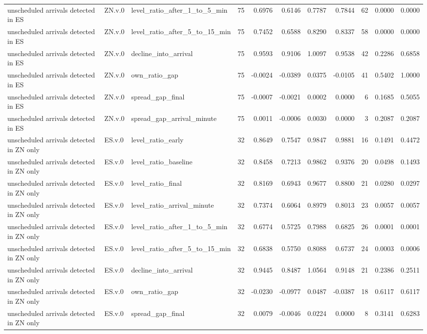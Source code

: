 \begin{tabular}{lllrrrrrrrr}
unscheduled arrivals detected in ES & ZN.v.0 & level_ratio_after_1_to_5_min & 75 & 0.6976 & 0.6146 & 0.7787 & 0.7844 & 62 & 0.0000 & 0.0000 \\
unscheduled arrivals detected in ES & ZN.v.0 & level_ratio_after_5_to_15_min & 75 & 0.7452 & 0.6588 & 0.8290 & 0.8337 & 58 & 0.0000 & 0.0000 \\
unscheduled arrivals detected in ES & ZN.v.0 & decline_into_arrival & 75 & 0.9593 & 0.9106 & 1.0097 & 0.9538 & 42 & 0.2286 & 0.6858 \\
unscheduled arrivals detected in ES & ZN.v.0 & own_ratio_gap & 75 & -0.0024 & -0.0389 & 0.0375 & -0.0105 & 41 & 0.5402 & 1.0000 \\
unscheduled arrivals detected in ES & ZN.v.0 & spread_gap_final & 75 & -0.0007 & -0.0021 & 0.0002 & 0.0000 & 6 & 0.1685 & 0.5055 \\
unscheduled arrivals detected in ES & ZN.v.0 & spread_gap_arrival_minute & 75 & 0.0011 & -0.0006 & 0.0030 & 0.0000 & 3 & 0.2087 & 0.2087 \\
unscheduled arrivals detected in ZN only & ES.v.0 & level_ratio_early & 32 & 0.8649 & 0.7547 & 0.9847 & 0.9881 & 16 & 0.1491 & 0.4472 \\
unscheduled arrivals detected in ZN only & ES.v.0 & level_ratio_baseline & 32 & 0.8458 & 0.7213 & 0.9862 & 0.9376 & 20 & 0.0498 & 0.1493 \\
unscheduled arrivals detected in ZN only & ES.v.0 & level_ratio_final & 32 & 0.8169 & 0.6943 & 0.9677 & 0.8800 & 21 & 0.0280 & 0.0297 \\
unscheduled arrivals detected in ZN only & ES.v.0 & level_ratio_arrival_minute & 32 & 0.7374 & 0.6064 & 0.8979 & 0.8013 & 23 & 0.0057 & 0.0057 \\
unscheduled arrivals detected in ZN only & ES.v.0 & level_ratio_after_1_to_5_min & 32 & 0.6774 & 0.5725 & 0.7988 & 0.6825 & 26 & 0.0001 & 0.0001 \\
unscheduled arrivals detected in ZN only & ES.v.0 & level_ratio_after_5_to_15_min & 32 & 0.6838 & 0.5750 & 0.8088 & 0.6737 & 24 & 0.0003 & 0.0006 \\
unscheduled arrivals detected in ZN only & ES.v.0 & decline_into_arrival & 32 & 0.9445 & 0.8487 & 1.0564 & 0.9148 & 21 & 0.2386 & 0.2511 \\
unscheduled arrivals detected in ZN only & ES.v.0 & own_ratio_gap & 32 & -0.0230 & -0.0977 & 0.0487 & -0.0387 & 18 & 0.6117 & 0.6117 \\
unscheduled arrivals detected in ZN only & ES.v.0 & spread_gap_final & 32 & 0.0079 & -0.0046 & 0.0224 & 0.0000 & 8 & 0.3141 & 0.6283 \\

\end{tabular}
